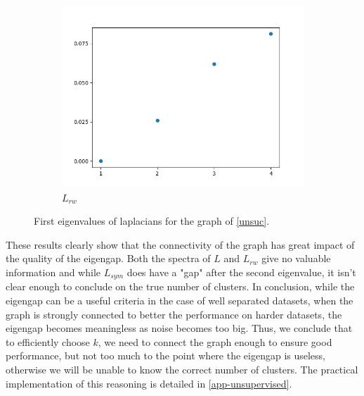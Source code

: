 \documentclass[a4paper,12pt]{article}
\theoremstyle{definition}
\theoremstyle{plain}
\begin{document}
\begin{figure}[H]
\begin{subfigure}{.3\textwidth}
		\includegraphics[width=1.1\linewidth]{figures/Fig_E6_L_rw}
		\caption{$L_{rw}$}
	\end{subfigure}
	\caption{First eigenvalues of laplacians for the graph of \ref{unsuc}.}
\end{figure}
These results clearly show that the connectivity of the graph has great impact of the quality of the eigengap. Both the spectra of $L$ and $L_{rw}$ give no valuable information and while $L_{sym}$ does have a "gap" after the second eigenvalue, it isn't clear enough to conclude on the true number of clusters.
In conclusion, while the eigengap can be a useful criteria in the case of well separated datasets, when the graph is strongly connected to better the performance on harder datasets, the eigengap becomes meaningless as noise becomes too big.
Thus, we conclude that to efficiently choose $k$, we need to connect the graph enough to ensure good performance, but not too much to the point where the eigengap is useless, otherwise we will be unable to know the correct number of clusters. The practical implementation of this reasoning is detailed in \ref{app-unsupervised}.
\end{document}
